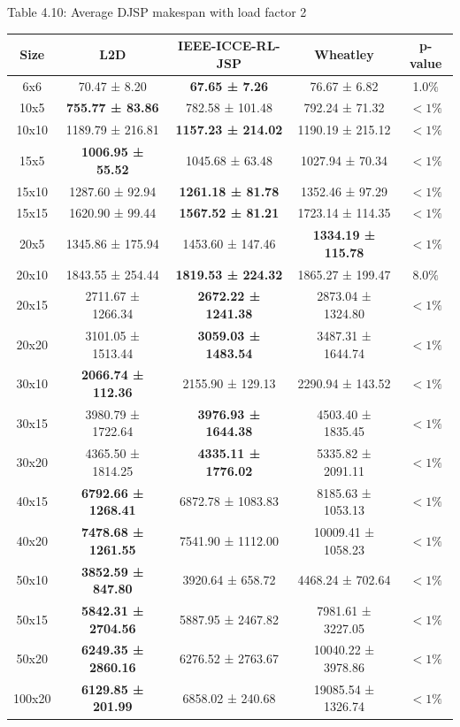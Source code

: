\begin{table}
    Table 4.10: Average DJSP makespan with load factor 2\\
    \vspace{1mm}
    \label{table:4.7}
    \footnotesize 
    \begin{tabular}{ccccc}
    \toprule
    Size & L2D & IEEE-ICCE-RL-JSP & Wheatley & p-value \\
    \midrule
    6x6 & 70.47 ± 8.20 & \textbf{67.65 ± 7.26} & 76.67 ± 6.82 & 1.0$\%$ \\
    10x5 & \textbf{755.77 ± 83.86} & 782.58 ± 101.48 & 792.24 ± 71.32 & $< 1\%$ \\
    10x10 & 1189.79 ± 216.81 & \textbf{1157.23 ± 214.02} & 1190.19 ± 215.12 & $< 1\%$ \\
    15x5 & \textbf{1006.95 ± 55.52} & 1045.68 ± 63.48 & 1027.94 ± 70.34 & $< 1\%$ \\
    15x10 & 1287.60 ± 92.94 & \textbf{1261.18 ± 81.78} & 1352.46 ± 97.29 & $< 1\%$ \\
    15x15 & 1620.90 ± 99.44 & \textbf{1567.52 ± 81.21} & 1723.14 ± 114.35 & $< 1\%$ \\
    20x5 & 1345.86 ± 175.94 & 1453.60 ± 147.46 & \textbf{1334.19 ± 115.78} & $< 1\%$ \\
    20x10 & 1843.55 ± 254.44 & \textbf{1819.53 ± 224.32} & 1865.27 ± 199.47 & 8.0$\%$ \\
    20x15 & 2711.67 ± 1266.34 & \textbf{2672.22 ± 1241.38} & 2873.04 ± 1324.80 & $< 1\%$ \\
    20x20 & 3101.05 ± 1513.44 & \textbf{3059.03 ± 1483.54} & 3487.31 ± 1644.74 & $< 1\%$ \\
    30x10 & \textbf{2066.74 ± 112.36} & 2155.90 ± 129.13 & 2290.94 ± 143.52 & $< 1\%$ \\
    30x15 & 3980.79 ± 1722.64 & \textbf{3976.93 ± 1644.38} & 4503.40 ± 1835.45 & $< 1\%$ \\
    30x20 & 4365.50 ± 1814.25 & \textbf{4335.11 ± 1776.02} & 5335.82 ± 2091.11 & $< 1\%$ \\
    40x15 & \textbf{6792.66 ± 1268.41} & 6872.78 ± 1083.83 & 8185.63 ± 1053.13 & $< 1\%$ \\
    40x20 & \textbf{7478.68 ± 1261.55} & 7541.90 ± 1112.00 & 10009.41 ± 1058.23 & $< 1\%$ \\
    50x10 & \textbf{3852.59 ± 847.80} & 3920.64 ± 658.72 & 4468.24 ± 702.64 & $< 1\%$ \\
    50x15 & \textbf{5842.31 ± 2704.56} & 5887.95 ± 2467.82 & 7981.61 ± 3227.05 & $< 1\%$ \\
    50x20 & \textbf{6249.35 ± 2860.16} & 6276.52 ± 2763.67 & 10040.22 ± 3978.86 & $< 1\%$ \\
    100x20 & \textbf{6129.85 ± 201.99} & 6858.02 ± 240.68 & 19085.54 ± 1326.74 & $< 1\%$ \\
    \bottomrule
    \end{tabular}
\end{table}
    
